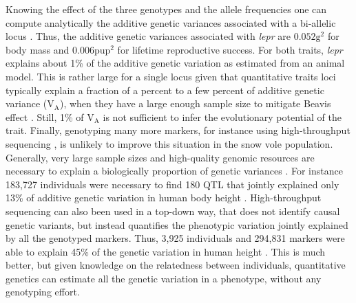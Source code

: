 Knowing the effect of the three genotypes and the allele frequencies one can compute analytically the additive genetic variances associated with a bi-allelic locus \parencite[][p77]{Fisher1941average,Lynch1998}. Thus, the additive genetic variances associated with \emph{lepr} are $0.052 \text{g}^2$ for body mass and $0.006 \text{pup}^2$ for lifetime reproductive success. For both traits, \emph{lepr} explains about 1\% of the additive genetic variation as estimated from an animal model. This is rather large for a single locus given that quantitative traits loci typically explain a fraction of a percent to a few percent of additive genetic variance (V$_\text{A}$), when they have a large enough sample size to mitigate Beavis effect \parencite{Flint2009,Jensen2014}.  Still, 1\% of V$_\text{A}$ is not sufficient to infer the evolutionary potential of the trait. Finally, genotyping many more markers, for instance using high-throughput sequencing \parencite{Goodwin2016}, is unlikely to improve this situation in the snow vole population. Generally, very large sample sizes and high-quality genomic resources are necessary to explain a biologically proportion of genetic variances \parencite{Bloom2013, Jensen2014}. For instance
183,727 individuals were necessary to find 180 QTL that jointly explained only 13\% of additive genetic variation in human body height \parencite{LangoAllen2010}.
High-throughput sequencing can also been used in a top-down way, that does not identify causal genetic variants, but instead quantifies the phenotypic variation jointly explained by all the genotyped markers. Thus, 3,925 individuals and 294,831 markers were able to explain 45\% of the genetic variation in human height \parencite{Yang2010}. This is much better, but given knowledge on the relatedness between individuals, quantitative genetics can estimate all the genetic variation in a phenotype, without any genotyping effort.


